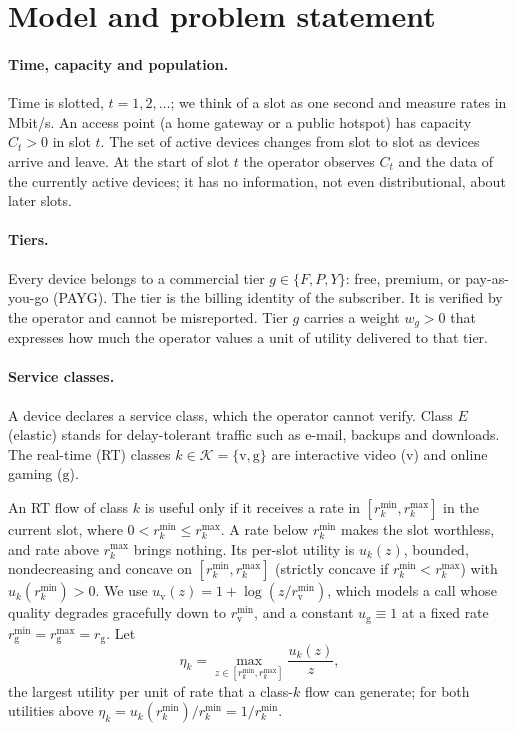 \documentclass[preprint,11pt]{elsarticle}
\theoremstyle{definition}
\theoremstyle{remark}
\newcommand{\rmin}{r^{\min}}
\newcommand{\rmax}{r^{\max}}
\newcommand{\cK}{\mathcal{K}}
\begin{document}
\section{Model and problem statement}\label{sec:model}

\paragraph{Time, capacity and population.}
Time is slotted, $t=1,2,\dots$; we think of a slot as one second and measure rates in Mbit/s.
An access point (a home gateway or a public hotspot) has capacity $C_t>0$ in slot $t$.
The set of active devices changes from slot to slot as devices arrive and leave.
At the start of slot $t$ the operator observes $C_t$ and the data of the currently active devices; it has no information, not even distributional, about later slots.

\paragraph{Tiers.}
Every device belongs to a commercial tier $g\in\{F,P,Y\}$: free, premium, or pay-as-you-go (PAYG).
The tier is the billing identity of the subscriber. It is verified by the operator and cannot be misreported.
Tier $g$ carries a weight $w_g>0$ that expresses how much the operator values a unit of utility delivered to that tier.

\paragraph{Service classes.}
A device declares a service class, which the operator cannot verify.
Class $E$ (elastic) stands for delay-tolerant traffic such as e-mail, backups and downloads.
The real-time (RT) classes $k\in\cK=\{\mathrm{v},\mathrm{g}\}$ are interactive video ($\mathrm{v}$) and online gaming ($\mathrm{g}$).

An RT flow of class $k$ is useful only if it receives a rate in $[\rmin_k,\rmax_k]$ in the current slot, where $0<\rmin_k\le\rmax_k$.
A rate below $\rmin_k$ makes the slot worthless, and rate above $\rmax_k$ brings nothing.
Its per-slot utility is $u_k(z)$, bounded, nondecreasing and concave on $[\rmin_k,\rmax_k]$ (strictly concave if $\rmin_k<\rmax_k$) with $u_k(\rmin_k)>0$.
We use $u_{\mathrm{v}}(z)=1+\log(z/\rmin_{\mathrm{v}})$, which models a call whose quality degrades gracefully down to $\rmin_{\mathrm{v}}$, and a constant $u_{\mathrm{g}}\equiv 1$ at a fixed rate $\rmin_{\mathrm{g}}=\rmax_{\mathrm{g}}=r_{\mathrm{g}}$.
Let
\begin{equation}\label{eq:eta}
\eta_k=\max_{z\in[\rmin_k,\rmax_k]}\frac{u_k(z)}{z},
\end{equation}
the largest utility per unit of rate that a class-$k$ flow can generate; for both utilities above $\eta_k=u_k(\rmin_k)/\rmin_k=1/\rmin_k$.
\end{document}
